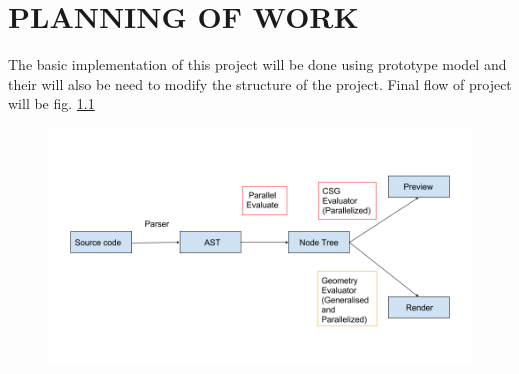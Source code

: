\chapter{PLANNING OF WORK}

The basic implementation of this project will be done using prototype model and their will also be need to modify the structure of the project. Final flow of project will be fig. \ref{fig:finalflow}

\begin{figure}[H]
\centering
\includegraphics[width=\linewidth]{images/finalflow}
\caption{}
\label{fig:finalflow}
\end{figure}

